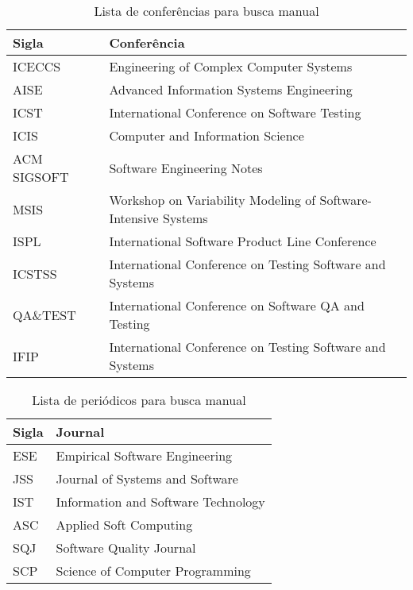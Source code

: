 \begin{table}[]
	\centering
	\caption{Lista de conferências para busca manual}
	\label{table:manual}
	\begin{tabular}{|l|l|}
		\hline
		\textbf{Sigla} & \textbf{Conferência}                                           \\ \hline
		ICECCS         & Engineering of Complex Computer Systems                        \\ \hline
		AISE           & Advanced Information Systems Engineering                       \\ \hline
		ICST           & International Conference on Software Testing                   \\ \hline
		ICIS           & Computer and Information Science                               \\ \hline
		ACM SIGSOFT    & Software Engineering Notes                                     \\ \hline
		MSIS           & Workshop on Variability Modeling of Software-Intensive Systems \\ \hline
		ISPL           & International Software Product Line Conference                 \\ \hline
		ICSTSS         & International Conference on Testing Software and Systems       \\ \hline
		QA\&TEST       & International Conference on Software QA and Testing            \\ \hline
		IFIP           & International Conference on Testing Software and Systems       \\ \hline
	\end{tabular}
\end{table}

\begin{table}[]
	\centering
	\caption{Lista de periódicos para busca manual}
	\label{table:jornal}
	\begin{tabular}{|l|l|}
		\hline
		\textbf{Sigla} & \textbf{Journal}                    \\ \hline
		ESE            & Empirical Software Engineering      \\ \hline
		JSS            & Journal of Systems and Software     \\ \hline
		IST            & Information and Software Technology \\ \hline
		ASC            & Applied Soft Computing              \\ \hline
		SQJ            & Software Quality Journal            \\ \hline
		SCP            & Science of Computer Programming     \\ \hline
	\end{tabular}
\end{table}

